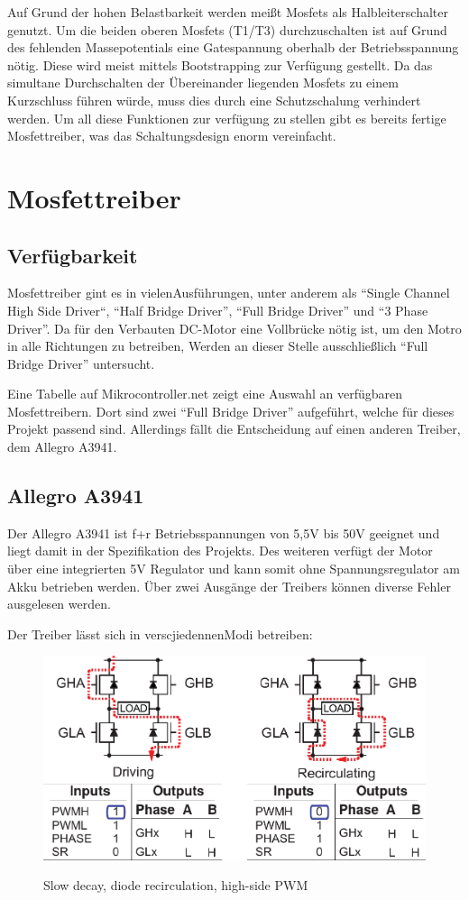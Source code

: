 Auf Grund der hohen Belastbarkeit werden meißt Mosfets als Halbleiterschalter genutzt. Um die beiden oberen Mosfets (T1/T3) durchzuschalten
ist auf Grund des fehlenden Massepotentials eine Gatespannung oberhalb der Betriebsspannung nötig. Diese wird meist mittels Bootstrapping zur
Verfügung gestellt. Da das simultane Durchschalten der Übereinander liegenden Mosfets zu einem Kurzschluss führen würde, muss dies durch
eine Schutzschalung verhindert werden. Um all diese Funktionen zur verfügung zu stellen gibt es bereits fertige Mosfettreiber,
was das Schaltungsdesign enorm vereinfacht.

\section{Mosfettreiber}
\subsection{Verfügbarkeit}

Mosfettreiber gint es in vielenAusführungen, unter anderem als ``Single Channel High Side Driver``, ``Half Bridge Driver'', ``Full Bridge Driver''
und ``3 Phase Driver''. Da für den Verbauten DC-Motor eine Vollbrücke nötig ist, um den Motro in alle Richtungen zu betreiben, Werden an dieser Stelle
ausschließlich ``Full Bridge Driver'' untersucht.

Eine Tabelle auf Mikrocontroller.net\cite{FET_D_TABLE} zeigt eine Auswahl an verfügbaren Mosfettreibern. Dort sind zwei
``Full Bridge Driver'' aufgeführt, welche für dieses Projekt passend sind. Allerdings fällt die Entscheidung auf einen anderen Treiber,
dem Allegro A3941.
\subsection{Allegro A3941}
Der Allegro A3941 ist f+r Betriebsspannungen von 5,5V bis 50V geeignet und liegt damit in der Spezifikation des Projekts.
Des weiteren verfügt der Motor über eine integrierten 5V Regulator und kann somit ohne Spannungsregulator am Akku betrieben werden.
Über zwei Ausgänge der Treibers können diverse Fehler ausgelesen werden.


Der Treiber lässt sich in verscjiedennenModi betreiben:

\begin{figure}[H]
\centering
\includegraphics[width=.8\textwidth]{3941_1.png}\\
\caption{Slow decay, diode recirculation, high-side PWM}%
\label{fig:3941_1}
\end{figure}

